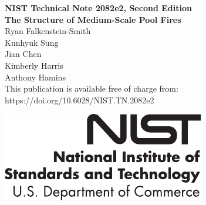 \documentclass[12pt]{article}
\newcommand{\pubnumber}{2082e2, Second Edition}
\newcommand{\DOI}{https://doi.org/10.6028/NIST.TN.2082e2}
\begin{document}
	
	\begin{titlepage}
		\begin{flushright}
\LARGE{\textbf{NIST Technical Note \pubnumber}}\\
\vfill
\Huge{\textbf{The Structure of Medium-Scale Pool Fires}}\\
\vfill
\large Ryan Falkenstein-Smith\\
\large Kunhyuk Sung\\
\large Jian Chen\\
\large Kimberly Harris\\
\large Anthony Hamins\\
\vfill
\normalsize This publication is available free of charge from:\\
\DOI\\
\vfill

\includegraphics[width=0.3\linewidth]{NIST-logo}\\


\end{flushright}
\end{titlepage}
\end{document}
